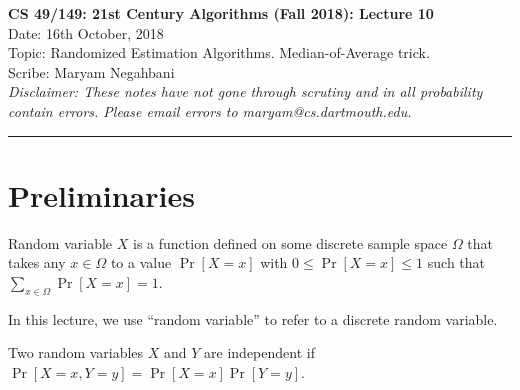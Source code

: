 \documentclass[11pt]{article}
\begin{document}
	\begin{center}
		{\bf \Large CS 49/149: 21st Century Algorithms (Fall 2018): Lecture 10}\\ 
		Date: 16th October, 2018 \\
		Topic: Randomized Estimation Algorithms. Median-of-Average trick. \\
		Scribe: Maryam Negahbani \\
		{\em Disclaimer: These notes have not gone through scrutiny and in all probability contain errors. Please email errors to maryam@cs.dartmouth.edu.}
	\end{center}
\hrule height 2pt
\vspace{3ex}
\section{Preliminaries}
\begin{definition}
Random variable $X$ is a function defined on some discrete sample space $\Omega$ that takes any $x \in \Omega$ to a value $\Pr[X = x]$ with $0 \leq \Pr[X = x] \leq 1$ such that $\sum\limits_{x \in \Omega} \Pr[X = x] = 1$.
\end{definition}
In this lecture, we use ``random variable'' to refer to a discrete random variable.

\begin{definition}
Two random variables $X$ and $Y$ are independent if $\Pr[X = x, Y = y] = \Pr[X = x]\Pr[Y = y]$.
\end{definition}
\end{document}
